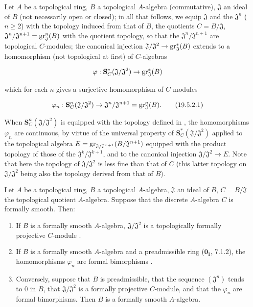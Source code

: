 \begin{env}[19.5.2]
\label{0.19.5.2}
Let $A$ be a topological ring, $B$ a topological $A$-algebra (commutative), $\mathfrak{J}$ an ideal of $B$ (not necessarily open or closed);
in all that follows, we equip $\mathfrak{J}$ and the $\mathfrak{J}^n$ ($n\geq 2$) with the topology induced from that of $B$, the quotients $C=B/\mathfrak{J}$, $\mathfrak{J}^n/\mathfrak{J}^{n+1}=\operatorname{gr}_\mathfrak{J}^n(B)$ with the quotient topology, so that the $\mathfrak{J}^n/\mathfrak{J}^{n+1}$ are topological $C$-modules;
the canonical injection $\mathfrak{J}/\mathfrak{J}^2\to\operatorname{gr}_\mathfrak{J}^*(B)$ extends to a homomorphism (not topological at first) of $C$-algebras

\[
\varphi:\mathbf{S}_C^*(\mathfrak{J}/\mathfrak{J}^2) \to \operatorname{gr}_\mathfrak{J}^*(B)
\]

which for each $n$ gives a surjective homomorphism of $C$-modules

\[
\varphi_n:\mathbf{S}_C^n(\mathfrak{J}/\mathfrak{J}^2) \to \mathfrak{J}^n/\mathfrak{J}^{n+1}=\operatorname{gr}_\mathfrak{J}^n(B). \tag{19.5.2.1}
\]


When $\mathbf{S}_C^n(\mathfrak{J}/\mathfrak{J}^2)$ is equipped with the topology defined in , the homomorphisms $\varphi_n$ are continuous, by virtue of the universal property  of $\mathbf{S}_C^*(\mathfrak{J}/\mathfrak{J}^2)$ applied to the topological algebra $E=\operatorname{gr}_{\mathfrak{J}/\mathfrak{J}^{n+1}}(B/\mathfrak{J}^{n+1})$ equipped with the product topology of those of the $\mathfrak{J}^k/\mathfrak{J}^{k+1}$, and to the canonical injection $\mathfrak{J}/\mathfrak{J}^2\to E$.
Note that here the topology of $\mathfrak{J}/\mathfrak{J}^2$ is less fine than that of $C$ (this latter topology on $\mathfrak{J}/\mathfrak{J}^2$ being also the topology derived from that of $B$).
\end{env}

\begin{theorem}[19.5.3]
\label{0.19.5.3}
Let $A$ be a topological ring, $B$ a topological $A$-algebra, $\mathfrak{J}$ an ideal of $B$, $C=B/\mathfrak{J}$ the topological quotient $A$-algebra.
Suppose that the discrete $A$-algebra $C$ is formally smooth.
Then:
\begin{enumerate}
  \item[\rm(i)] If $B$ is a formally smooth $A$-algebra, $\mathfrak{J}/\mathfrak{J}^2$ is a topologically formally projective $C$-module .
  \item[\rm(ii)] If $B$ is a formally smooth $A$-algebra and a preadmissible ring ($\mathbf{0_I}$, 7.1.2), the homomorphisms $\varphi_n$  are formal bimorphisms .
  \item[\rm(iii)] Conversely, suppose that $B$ is preadmissible, that the sequence $(\mathfrak{J}^n)$ tends to $0$ in $B$, that $\mathfrak{J}/\mathfrak{J}^2$ is a formally projective $C$-module, and that the $\varphi_n$ are formal bimorphisms. Then $B$ is a formally smooth $A$-algebra.
\end{enumerate}
\end{theorem}

